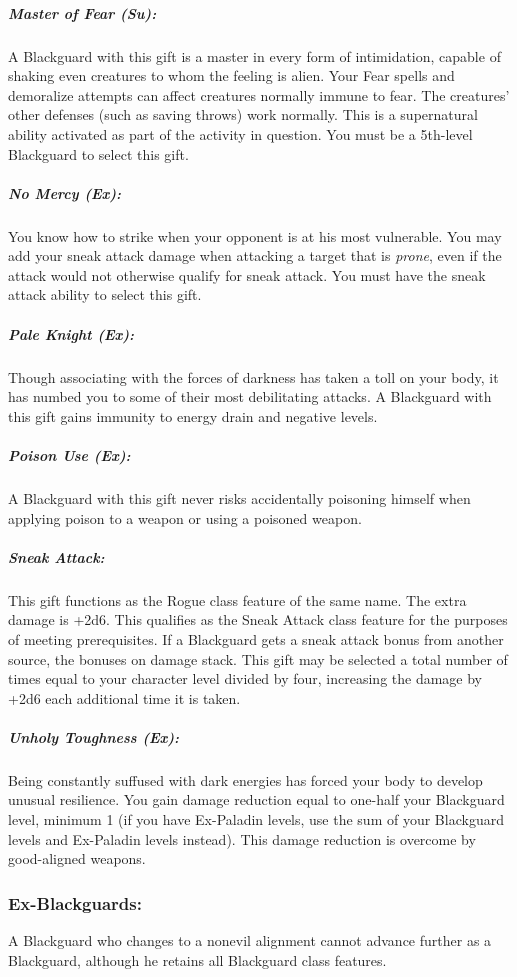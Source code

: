 \subparagraph{Master of Fear (Su):}
A Blackguard with this gift is a master in every form of intimidation, capable of shaking even creatures to whom the feeling is alien. Your Fear spells and demoralize attempts can affect creatures normally immune to fear. The creatures' other defenses (such as saving throws) work normally. This is a supernatural ability activated as part of the activity in question.
You must be a 5th-level Blackguard to select this gift.

\subparagraph{No Mercy (Ex):}
You know how to strike when your opponent is at his most vulnerable. You may add your sneak attack damage when attacking a target that is \emph{prone}, even if the attack would not otherwise qualify for sneak attack. You must have the sneak attack ability to select this gift.

\subparagraph{Pale Knight (Ex):}
Though associating with the forces of darkness has taken a toll on your body, it has numbed you to some of their most debilitating attacks. A Blackguard with this gift gains immunity to energy drain and negative levels. 

\subparagraph{Poison Use (Ex):}
A Blackguard with this gift never risks accidentally poisoning himself when applying poison to a weapon or using a poisoned weapon.

\subparagraph{Sneak Attack:}
This gift functions as the Rogue class feature of the same name. 
The extra damage is +2d6. 
This qualifies as the Sneak Attack class feature for the purposes of meeting prerequisites.
If a Blackguard gets a sneak attack bonus from another source, the bonuses on damage stack.
This gift may be selected a total number of times equal to your character level divided by four, increasing the damage by +2d6 each additional time it is taken.

\subparagraph{Unholy Toughness (Ex):}
Being constantly suffused with dark energies has forced your body to develop unusual resilience. You gain damage reduction equal to one-half your Blackguard level, minimum 1 (if you have Ex-Paladin levels, use the sum of your Blackguard levels and Ex-Paladin levels instead). This damage reduction is overcome by good-aligned weapons.

\subsubsection{Ex-Blackguards:}
A Blackguard who changes to a nonevil alignment cannot advance further as a Blackguard, although he retains all Blackguard class features.


